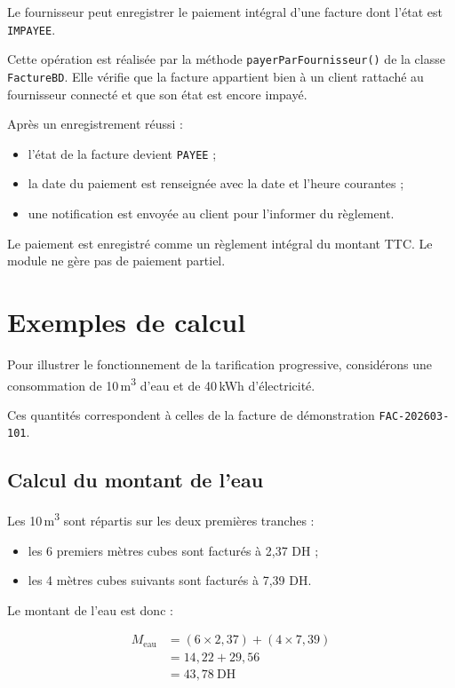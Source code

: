 Le fournisseur peut enregistrer le paiement intégral d'une facture dont l'état est \texttt{IMPAYEE}.

Cette opération est réalisée par la méthode \texttt{payerParFournisseur()} de la classe \texttt{FactureBD}. Elle vérifie que la facture appartient bien à un client rattaché au fournisseur connecté et que son état est encore impayé.

Après un enregistrement réussi :
\begin{itemize}
    \item l'état de la facture devient \texttt{PAYEE} ;
    \item la date du paiement est renseignée avec la date et l'heure courantes ;
    \item une notification est envoyée au client pour l'informer du règlement.
\end{itemize}

Le paiement est enregistré comme un règlement intégral du montant TTC. Le module ne gère pas de paiement partiel.

\section{Exemples de calcul}

Pour illustrer le fonctionnement de la tarification progressive, considérons une consommation de 10\,m\textsuperscript{3} d'eau et de 40\,kWh d'électricité.

Ces quantités correspondent à celles de la facture de démonstration \texttt{FAC-202603-101}.

\subsection*{Calcul du montant de l'eau}

Les 10\,m\textsuperscript{3} sont répartis sur les deux premières tranches :
\begin{itemize}
    \item les 6 premiers mètres cubes sont facturés à 2,37 DH ;
    \item les 4 mètres cubes suivants sont facturés à 7,39 DH.
\end{itemize}

Le montant de l'eau est donc :

\[
\begin{aligned}
M_{\text{eau}} & = (6 \times 2,37) + (4 \times 7,39) \\
               & = 14,22 + 29,56 \\
               & = 43,78\ \text{DH}
\end{aligned}
\]

